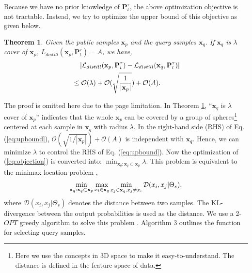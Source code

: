 \documentclass[letterpaper]{article} %
\newtheorem{thm}{Theorem}
\begin{document}
Because we have no prior knowledge of $\textbf{P}_t^\tau$, the above optimization objective is not tractable. Instead, we try to optimize the upper bound of this objective as given below.

\begin{thm}\label{thm:core}
Given the public samples $\textbf{x}_p$ and the query samples $\textbf{x}_q$. If $\textbf{x}_q$ is $\lambda$ cover of $\textbf{x}_p $, ${{L_{distill}}({\textbf{x}_p},\textbf{P}_t^\tau )}=A$, we have,
\begin{equation}\label{eq:upbound}
\begin{aligned}
& \quad \left| {{{\mathcal L}_{distill}}({{\textbf{x}}_p},{\textbf{P}}_t^\tau ) - {{\mathcal L}_{distill}}({{\textbf{x}}_q},{\textbf{P}}_t^\tau )} \right| \\
& \le {\mathcal O}(\lambda ) + {\mathcal O}(\sqrt {{1 \over {|{{\textbf{x}}_p}|}}} ) + {\mathcal O}(A).
\end{aligned}
\end{equation}
\end{thm}

The proof is omitted here due to the page limitation. In Theorem \ref{thm:core}, ``$\textbf{x}_q$ is $\lambda$ cover of $\textbf{x}_p $'' indicates that the whole $\textbf{x}_p$ can be covered by a group of spheres\footnote{Here we use the concepts in 3D space to make it easy-to-understand. The distance is defined in the feature space of data.} centered at each sample in $\textbf{x}_q$ with radius $\lambda$. In the right-hand side (RHS) of Eq. (\ref{eq:upbound}), ${\mathcal O}(\sqrt {{1 / {|{{\textbf{x}}_p}|}}} ) + {\mathcal O}(A)$ is independent with $\textbf{x}_q$. Hence, we can minimize $\lambda$ to control the RHS of Eq. (\ref{eq:upbound}). Now the optimization of (\ref{eq:objection}) is converted into: $\min _{\textbf{x}_q:\textbf{x}_q \subset \textbf{x}_p}\lambda$. This problem is equivalent to the minimax location problem \cite{korupolu2000analysis},
\begin{equation}
\mathop {\min }\limits_{{{\bf{x}}_q}:{{\bf{x}}_q} \subset {{\bf{x}}_p}} \mathop {\max }\limits_{{x_i} \in {{\bf{x}}_q}} \mathop {\min }\limits_{{x_j} \in {{\bf{x}}_q},{x_j} \ne {x_i}} \mathcal{D} ({x_i},{x_j}| \Theta_s), 
\end{equation}
where $\mathcal{D} ({x_i},{x_j}| \Theta_s)$ denotes the distance between two samples. The KL-divergence between the output probabilities is used as the distance. We use a 2-$OPT$ greedy algorithm to solve this problem \cite{korupolu2000analysis}. Algorithm 3 outlines the function for selecting query samples.
\end{document}
